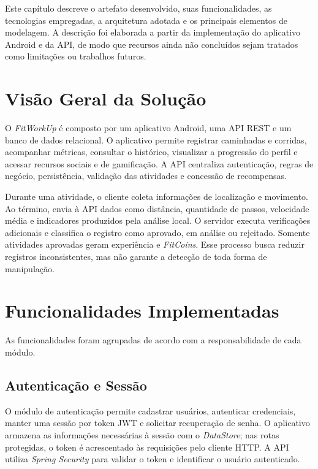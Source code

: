\label{cap:fitworkup}

Este capítulo descreve o artefato desenvolvido, suas funcionalidades, as tecnologias empregadas, a arquitetura adotada e os principais elementos de modelagem. A descrição foi elaborada a partir da implementação do aplicativo Android e da API, de modo que recursos ainda não concluídos sejam tratados como limitações ou trabalhos futuros.

\section{Visão Geral da Solução}
\label{sec:fitworkup_visao_geral}

O \textit{FitWorkUp} é composto por um aplicativo Android, uma API REST e um banco de dados relacional. O aplicativo permite registrar caminhadas e corridas, acompanhar métricas, consultar o histórico, visualizar a progressão do perfil e acessar recursos sociais e de gamificação. A API centraliza autenticação, regras de negócio, persistência, validação das atividades e concessão de recompensas.

Durante uma atividade, o cliente coleta informações de localização e movimento. Ao término, envia à API dados como distância, quantidade de passos, velocidade média e indicadores produzidos pela análise local. O servidor executa verificações adicionais e classifica o registro como aprovado, em análise ou rejeitado. Somente atividades aprovadas geram experiência e \textit{FitCoins}. Esse processo busca reduzir registros inconsistentes, mas não garante a detecção de toda forma de manipulação.

\section{Funcionalidades Implementadas}
\label{sec:fitworkup_funcionalidades}

As funcionalidades foram agrupadas de acordo com a responsabilidade de cada módulo.

\subsection{Autenticação e Sessão}

O módulo de autenticação permite cadastrar usuários, autenticar credenciais, manter uma sessão por token JWT e solicitar recuperação de senha. O aplicativo armazena as informações necessárias à sessão com o \textit{DataStore}; nas rotas protegidas, o token é acrescentado às requisições pelo cliente HTTP. A API utiliza \textit{Spring Security} para validar o token e identificar o usuário autenticado.

